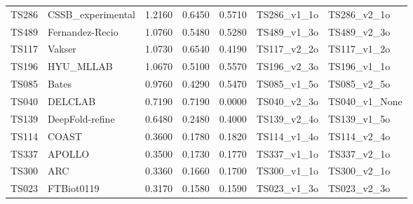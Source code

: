 \begin{table}[ht]
{\begin{tabular}{llrrrll}
TS286 & CSSB\_experimental & 1.2160 & 0.6450 & 0.5710 & TS286\_v1\_1o & TS286\_v2\_1o \\ 
TS489 & Fernandez-Recio & 1.0760 & 0.5480 & 0.5280 & TS489\_v1\_3o & TS489\_v2\_3o \\ 
TS117 & Vakser & 1.0730 & 0.6540 & 0.4190 & TS117\_v2\_2o & TS117\_v1\_2o \\ 
TS196 & HYU\_MLLAB & 1.0670 & 0.5100 & 0.5570 & TS196\_v2\_3o & TS196\_v1\_1o \\ 
TS085 & Bates & 0.9760 & 0.4290 & 0.5470 & TS085\_v1\_5o & TS085\_v2\_5o \\ 
TS040 & DELCLAB & 0.7190 & 0.7190 & 0.0000 & TS040\_v2\_3o & TS040\_v1\_None \\ 
TS139 & DeepFold-refine & 0.6480 & 0.2480 & 0.4000 & TS139\_v2\_4o & TS139\_v1\_5o \\ 
TS114 & COAST & 0.3600 & 0.1780 & 0.1820 & TS114\_v1\_4o & TS114\_v2\_4o \\ 
TS337 & APOLLO & 0.3500 & 0.1730 & 0.1770 & TS337\_v1\_1o & TS337\_v2\_1o \\ 
TS300 & ARC & 0.3360 & 0.1660 & 0.1700 & TS300\_v1\_1o & TS300\_v2\_1o \\ 
TS023 & FTBiot0119 & 0.3170 & 0.1580 & 0.1590 & TS023\_v1\_3o & TS023\_v2\_3o \\ 
\bottomrule
\end{tabular}%
}
\end{table}
